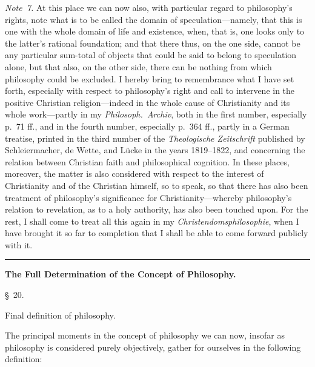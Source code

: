 \documentclass[12pt,a4paper]{book}
\newcommand{\grouphead}[1]{%
  \bigskip\begin{center}\large\textbf{#1}\end{center}\smallskip}
\begin{document}
{\small\emph{Note~7.} At this place we can now also, with particular regard to
philosophy's rights, note what is to be called the domain of speculation---namely,
that this is one with the whole domain of life and existence, when, that is, one
looks only to the latter's rational foundation; and that there thus, on the one side,
cannot be any particular sum-total of objects that could be said to belong to
speculation alone, but that also, on the other side, there can be nothing from which
philosophy could be excluded. I hereby bring to remembrance what I have set forth,
especially with respect to philosophy's right and call to intervene in the positive
Christian religion---indeed in the whole cause of Christianity and its whole
work---partly in my \textit{Philosoph.\ Archiv}, both in the first number, especially
p.~71 ff., and in the fourth number, especially p.~364 ff., partly in a German
treatise, printed in the third number of the \textit{Theologische Zeitschrift}
published by Schleiermacher, de Wette, and Lücke in the years 1819--1822, and
concerning the relation between Christian faith and philosophical cognition. In these
places, moreover, the matter is also considered with respect to the interest of
Christianity and of the Christian himself, so to speak, so that there has also been
treatment of philosophy's significance for Christianity---whereby philosophy's
relation to revelation, as to a holy authority, has also been touched upon. For the
rest, I shall come to treat all this again in my \textit{Christendomsphilosophie},
when I have brought it so far to completion that I shall be able to come forward
publicly with it.\par}

\begin{center}\rule{0.18\linewidth}{0.4pt}\end{center}

\grouphead{The Full Determination of the Concept of Philosophy.}

\begin{center}\large\S~20.\end{center}
\begin{center}Final definition of philosophy.\end{center}

The principal moments in the concept of philosophy we can now, insofar as philosophy
is considered purely objectively, gather for ourselves in the following definition:
\end{document}
